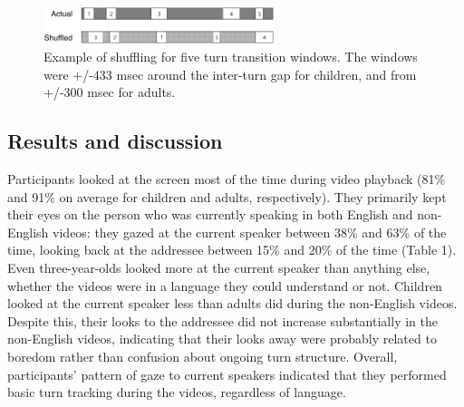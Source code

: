 \documentclass[authoryear, 12pt]{elsarticle}
\begin{document}
\begin{figure}[ht]
\begin{center}
\includegraphics[width=0.6\textwidth]{figures/FIG-ShuffledWindows.png}
\end{center}
\caption{Example of shuffling for five turn transition windows. The windows were +/-433 msec around the inter-turn gap for children, and from +/-300 msec for adults.} 
\label{shuffling}
\end{figure}

\subsection{Results and discussion}
\label{sec:results1}

Participants looked at the screen most of the time during video playback (81\% and 91\% on average for children and adults, respectively). They primarily kept their eyes on the person who was currently speaking in both English and non-English videos: they gazed at the current speaker between 38\% and 63\% of the time, looking back at the addressee between 15\% and 20\% of the time (Table 1). Even three-year-olds looked more at the current speaker than anything else, whether the videos were in a language they could understand or not. Children looked at the current speaker less than adults did during the non-English videos. Despite this, their looks to the addressee did not increase substantially in the non-English videos, indicating that their looks away were probably related to boredom rather than confusion about ongoing turn structure. Overall, participants' pattern of gaze to current speakers indicated that they performed basic turn tracking during the videos, regardless of language.
\end{document}

